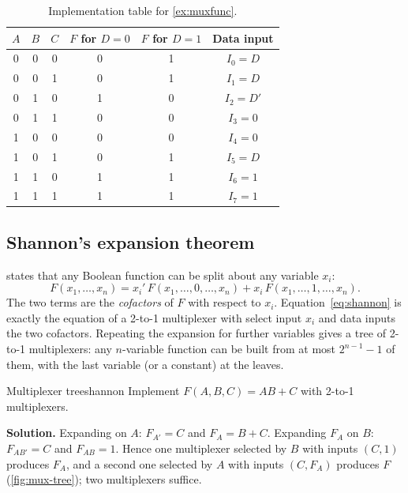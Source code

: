 \begin{table}[htbp]
\centering
\small
\caption{Implementation table for \cref{ex:muxfunc}.}
\label{tab:muximpl}
\begin{tabular}{ccc|cc|c}
\toprule
$A$&$B$&$C$&$F$ for $D=0$&$F$ for $D=1$&Data input\\ \midrule
0&0&0&0&1&$I_0=D$\\
0&0&1&0&1&$I_1=D$\\
0&1&0&1&0&$I_2=D'$\\
0&1&1&0&0&$I_3=0$\\
1&0&0&0&0&$I_4=0$\\
1&0&1&0&1&$I_5=D$\\
1&1&0&1&1&$I_6=1$\\
1&1&1&1&1&$I_7=1$\\ \bottomrule
\end{tabular}
\end{table}


\subsection{Shannon's expansion theorem}
 states that any Boolean function can be split about any variable $x_i$:
\begin{equation}
  F(x_1,\dots,x_n) = x_i'\,F(x_1,\dots,0,\dots,x_n) + x_i\,F(x_1,\dots,1,\dots,x_n).
  \label{eq:shannon}
\end{equation}
The two terms are the \emph{cofactors} of $F$ with respect to $x_i$. Equation~\eqref{eq:shannon} is exactly the equation of a 2-to-1 multiplexer with select input $x_i$ and data inputs the two cofactors. Repeating the expansion for further variables gives a tree of 2-to-1 multiplexers: any $n$-variable function can be built from at most $2^{n-1}-1$ of them, with the last variable (or a constant) at the leaves.

\begin{example}{Multiplexer tree}{shannon}
Implement $F(A,B,C)=AB+C$ with 2-to-1 multiplexers.

\textbf{Solution.} Expanding on $A$: $F_{A'}=C$ and $F_A=B+C$. Expanding $F_A$ on $B$: $F_{AB'}=C$ and $F_{AB}=1$. Hence one multiplexer selected by $B$ with inputs $(C,1)$ produces $F_A$, and a second one selected by $A$ with inputs $(C, F_A)$ produces $F$ (\cref{fig:mux-tree}); two multiplexers suffice.
\end{example}

